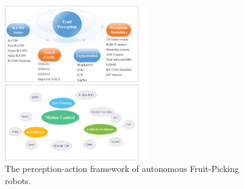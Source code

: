 \documentclass[a4paper,fleqn]{cas-dc}
\begin{document}
\begin{figure}[h!]
    \centering
    \includegraphics[width=0.55\textwidth]{fig_struct2.png}
    \caption{The perception-action framework of autonomous Fruit-Picking robots.}
    \label{fig:struct}
\end{figure}
\end{document}
